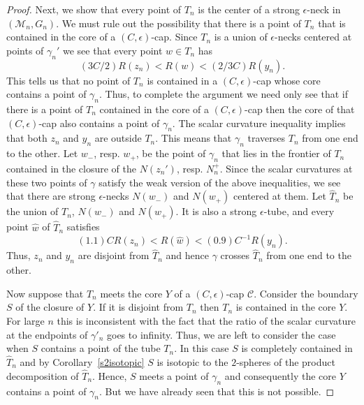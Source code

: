\begin{proof}
Next, we show that every point of $T_n$ is the center of a strong
$\epsilon$-neck in $({\mathcal M}_n,G_n)$. We must rule out the
possibility that there is a
 point of $T_n$ that is contained in the core of a $(C,\epsilon)$-cap.
Since $T_n$ is a union of $\epsilon$-necks centered at points of
$\gamma_n'$ we see that every point  $w\in T_n$ has
$$(3C/2)R(z_n)<R(w)<(2/3C)R(y_n).$$
This tells us that no point of $T_n$ is contained in a
$(C,\epsilon)$-cap whose core contains a point of $\gamma_n$. Thus,
to complete the argument we need only see that if there is a point
of $T_n$ contained in the core of a $(C,\epsilon)$-cap then the core
of that $(C,\epsilon)$-cap also contains a point of $\gamma_n$.
 The
scalar curvature inequality implies that both $z_n$ and $y_n$ are
outside $T_n$. This means that $\gamma_n$ traverses $T_n$ from one
end to the other. Let $w_-$, resp. $w_+$, be the point of $\gamma_n$
that lies in the frontier of $T_n$ contained in the closure of the
$N(z_n')$, resp. $N^+_n$. Since the scalar curvatures at these two
points of $\gamma$ satisfy the weak version of the above
inequalities, we see that there are strong $\epsilon$-necks $N(w_-)$
and $N(w_+)$ centered at them. Let $\widehat T_n$ be the union of
$T_n$, $N(w_-)$ and $N(w_+)$. It is also a strong $\epsilon$-tube,
and every point $\hat w$ of $\widehat T_n$ satisfies
$$(1.1)CR(z_n)<R(\hat w)<(0.9)C^{-1}R(y_n).$$
Thus, $z_n$ and $y_n$ are disjoint from $\widehat T_n$ and hence
$\gamma$ crosses $\widehat T_n$ from one end to the other.

 Now
suppose that $T_n$ meets the core $Y$ of a $(C,\epsilon)$-cap
${\mathcal C}$.
 Consider the boundary $S$ of the closure of $Y$.
If it is disjoint from $T_n$ then $T_n$ is contained in the core
$Y$. For large $n$ this is inconsistent with the fact that the ratio
of the scalar curvature at the endpoints of $\gamma'_n$ goes to
infinity. Thus, we are left to consider the case when
 $S$ contains a point of the tube $T_n$. In this case $S$ is
completely contained in $\widehat T_n$ and by
Corollary~\ref{s2isotopic} $S$ is isotopic to the $2$-spheres of the
product decomposition of $\widehat T_n$. Hence, $S$ meets a point of
$\gamma_n$ and consequently the core $Y$ contains a point of
$\gamma_n$. But we have already seen that this is not possible.


\end{proof}
